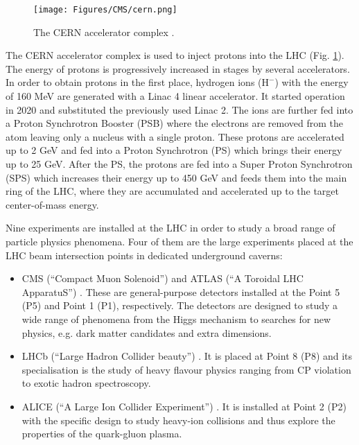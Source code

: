 \begin{figure}[h!]
    \centering
    \texttt{[image: Figures/CMS/cern.png]}
    \caption{The CERN accelerator complex \cite{Mobs:2684277}.}
    \label{fig:cern}
\end{figure}

The CERN accelerator complex is used to inject protons into the LHC (Fig. \ref{fig:cern}). The energy of protons is progressively increased in stages by several accelerators. In order to obtain protons in the first place, hydrogen ions ($\text{H}^{-}$) with the energy of 160 MeV are generated with a Linac 4 linear accelerator. It started operation in 2020 and substituted the previously used Linac 2. The ions are further fed into a Proton Synchrotron Booster (PSB) where the electrons are removed from the atom leaving only a nucleus with a single proton. These protons are accelerated up to 2 GeV and fed into a Proton Synchrotron (PS) which brings their energy up to 25 GeV. After the PS, the protons are fed into a Super Proton Synchrotron (SPS) which increases their energy up to 450 GeV and feeds them into the main ring of the LHC, where they are accumulated and accelerated up to the target center-of-mass energy.  

Nine experiments are installed at the LHC in order to study a broad range of particle physics phenomena. Four of them are the large experiments placed at the LHC beam intersection points in dedicated underground caverns:  
\begin{itemize}
    \item CMS (\enquote{Compact Muon Solenoid}) \cite{CMS:2008xjf} and ATLAS (\enquote{A Toroidal LHC ApparatuS}) \cite{ATLAS:2008xda}. These are general-purpose detectors installed at the Point 5 (P5) and Point 1 (P1), respectively. The detectors are designed to study a wide range of phenomena from the Higgs mechanism to searches for new physics, e.g. dark matter candidates and extra dimensions.
    
    \item LHCb (\enquote{Large Hadron Collider beauty}) \cite{LHCb:2008vvz}. It is placed at Point 8 (P8) and its specialisation is the study of heavy flavour physics ranging from CP violation to exotic hadron spectroscopy.  
    
    \item ALICE (\enquote{A Large Ion Collider Experiment}) \cite{ALICE:2008ngc}. It is installed at Point 2 (P2) with the specific design to study heavy-ion collisions and thus explore the properties of the quark-gluon plasma.
\end{itemize}

